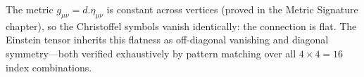\documentclass[11pt,a4paper]{book}
\def\cdot{.}%
\begin{document}
The metric $g_{\mu\nu} = d \cdot \eta_{\mu\nu}$ is constant across
vertices (proved in the Metric Signature chapter), so the Christoffel
symbols vanish identically: the connection is flat. The Einstein
tensor inherits this flatness as off-diagonal vanishing and diagonal
symmetry---both verified exhaustively by pattern matching over all
$4 \times 4 = 16$ index combinations.

\begin{code}%
\>[0]\<%
\\
\>[0]\AgdaSpace{}%
\AgdaSymbol{:}\AgdaSpace{}%
\<%
\\
\>[0]\AgdaSpace{}%
\AgdaSymbol{=}\AgdaSpace{}%
\AgdaSpace{}%
%
\>[42]\<%
\\
%
\\[\AgdaEmptyExtraSkip]%
\>[0]\<%
\\
\>[0]\AgdaSpace{}%
\AgdaSymbol{:}\AgdaSpace{}%
\AgdaSpace{}%
\AgdaSpace{}%
\AgdaSpace{}%
\AgdaSpace{}%
\AgdaSpace{}%
\AgdaSpace{}%
\<%
\\
\>[0]\AgdaSpace{}%
\AgdaSpace{}%
\AgdaSpace{}%
\AgdaSpace{}%
\AgdaSymbol{=}\AgdaSpace{}%
\AgdaSpace{}%
\AgdaSpace{}%
\AgdaSpace{}%
\AgdaSpace{}%
\AgdaSpace{}%
\<%
\\
%
\\[\AgdaEmptyExtraSkip]%
\>[0]\<%
\\
\>[0]\AgdaSpace{}%
\AgdaSymbol{:}\AgdaSpace{}%
\AgdaSpace{}%
\AgdaSpace{}%
\<%
\\
\>[0]\AgdaSpace{}%
\AgdaSpace{}%
\AgdaSymbol{=}\AgdaSpace{}%
\<%
\\
\>[0]\AgdaSpace{}%
\AgdaSymbol{(}\AgdaSpace{}%
\AgdaSymbol{)}\AgdaSpace{}%
\AgdaSymbol{=}\AgdaSpace{}%

\end{code}
\end{document}
